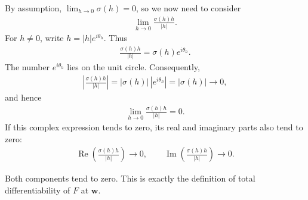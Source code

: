 \documentclass[11pt]{article}
\theoremstyle{plain}
\theoremstyle{definition}
\theoremstyle{remark}
\numberwithin{equation}{section}
\newcommand{\be}{\begin{eqnarray}}
\newcommand{\ee}{\end{eqnarray}}
\newcommand{\ww}{\mathbf w}
\DeclareMathOperator{\Real}{Re}
\DeclareMathOperator{\Imag}{Im}
\begin{document}
By assumption, $\lim_{h\to0}\sigma(h)=0$, so we now need to consider
\be
 \lim_{h\to0}\frac{\sigma(h)h}{|h|}.
\ee
For $h\ne0$, write $h=|h|e^{i\theta_h}$. Thus
\be
 \frac{\sigma(h)h}{|h|}=\sigma(h)e^{i\theta_h}.
\ee
The number $e^{i\theta_h}$ lies on the unit circle. Consequently,
\be
 \left|\frac{\sigma(h)h}{|h|}\right|
 =|\sigma(h)|\,|e^{i\theta_h}|=|\sigma(h)|\longrightarrow0,
\ee
and hence
\be
 \lim_{h\to0}\frac{\sigma(h)h}{|h|}=0.
\ee
If this complex expression tends to zero, its real and imaginary parts
also tend to zero:
\be
 \Real\left(\frac{\sigma(h)h}{|h|}\right)\longrightarrow0,
 \qquad
 \Imag\left(\frac{\sigma(h)h}{|h|}\right)\longrightarrow0.
\ee

Both components tend to zero. This is exactly the definition of total
differentiability of $F$ at $\ww$.

\end{document}
